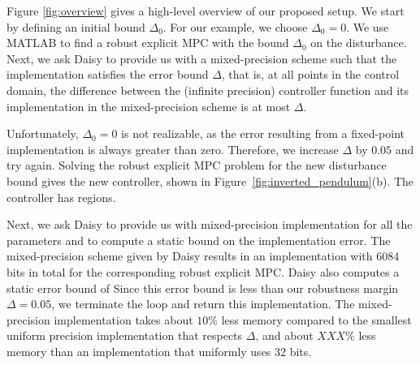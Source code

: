 
	
Figure \ref{fig:overview} gives a high-level overview of our proposed setup. 
We start by defining an initial bound $\Delta_0$. 
For our example, we choose $\Delta_0=0$. 
We use MATLAB to find a robust explicit MPC with the bound $\Delta_0$ on the disturbance.
Next, we ask Daisy
to provide us with a mixed-precision scheme such that the implementation satisfies the error bound $\Delta$, that is,
at all points in the control domain, the difference between the (infinite precision) controller function
and its implementation in the mixed-precision scheme is at most $\Delta$.

Unfortunately, $\Delta_0=0$ is not realizable,  as the error resulting from a fixed-point 
implementation is always greater than zero. 
Therefore, we increase $\Delta$ by $0.05$ and try again. 
Solving the robust explicit MPC problem for the new disturbance bound gives the new controller,
shown in Figure~\ref{fig:inverted_pendulum}(b).
The controller has  regions.

Next, we ask Daisy to provide us with mixed-precision implementation for all the parameters and to compute a static bound on the
implementation error. 
The mixed-precision scheme given by Daisy results in an implementation with $6084$ bits in total 
for the corresponding robust explicit MPC.
Daisy also computes a static error bound of 
Since this error bound is less than our robustness margin $\Delta = 0.05$, we terminate the loop
and return this implementation.
The mixed-precision implementation takes about $10\%$ less memory compared 
to the smallest uniform precision implementation that respects $\Delta$,
and about $XXX\%$  less memory than an implementation that uniformly uses
32 bits.
	
